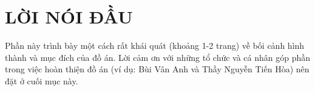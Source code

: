 \section*{LỜI NÓI ĐẦU}
\thispagestyle{empty}
Phần này trình bày một cách rất khái quát (khoảng 1-2 trang) về bối cảnh hình thành và mục đích của đồ án. Lời cảm ơn với những tổ chức và cá nhân góp phần trong việc hoàn thiện đồ án (ví dụ: Bùi Vân Anh và Thầy Nguyễn Tiến Hòa) nên đặt ở cuối mục này.
\cleardoublepage